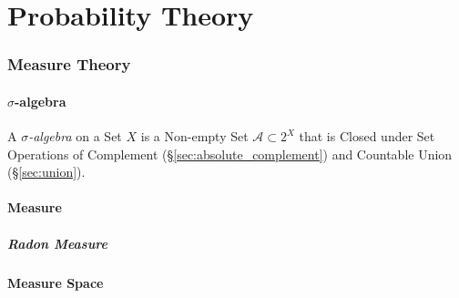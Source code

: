 \part{Probability Theory}\label{sec:probability_theory}

\section{Measure Theory}\label{sec:measure_theory}

\subsection{$\sigma$-algebra}\label{sec:sigma_algebra}

A \emph{$\sigma$-algebra} on a Set $X$ is a Non-empty Set $\mathcal{A}
\subset 2^X$ that is Closed under Set Operations of Complement
(\S\ref{sec:absolute_complement}) and Countable Union
(\S\ref{sec:union}).



\subsection{Measure}\label{sec:measure}

\subsubsection{Radon Measure}\label{sec:radon_measure}



\subsection{Measure Space}\label{sec:measure_space}


